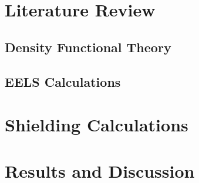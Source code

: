 \documentclass[12pt]{report}
\begin{document}



\chapter{Literature Review}

\section{Density Functional Theory}

\section{EELS Calculations}


\chapter{Shielding Calculations}




\chapter{Results and Discussion}

\end{document}
